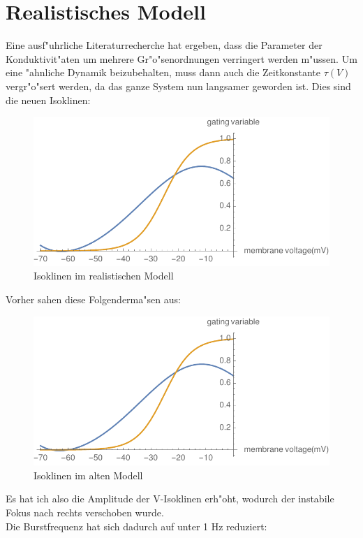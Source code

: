 \documentclass[12pt,a4paper]{article}
\begin{document}
\section{Realistisches Modell}
Eine ausf"uhrliche Literaturrecherche hat ergeben, dass die Parameter der Konduktivit"aten um mehrere Gr"o"senordnungen verringert werden m"ussen. Um eine "ahnliche Dynamik beizubehalten, muss dann auch die Zeitkonstante $\tau(V)$ vergr"o"sert werden, da das ganze System nun langsamer geworden ist.
Dies sind die neuen Isoklinen:
\begin{figure}[H]
	\centering
	\includegraphics[scale=0.9]{nullclines70Hz.pdf}
	\caption{Isoklinen im realistischen Modell}
	\label{isonew}
\end{figure}
Vorher sahen diese Folgenderma"sen aus:
\begin{figure}[H]
	\centering
	\includegraphics[scale=0.9]{nullclinenew.pdf}
	\caption{Isoklinen im alten Modell}
	\label{isoold}
\end{figure}
Es hat ich also die Amplitude der V-Isoklinen erh"oht, wodurch der instabile Fokus nach rechts verschoben wurde.\\
Die Burstfrequenz hat sich dadurch auf unter 1 Hz reduziert:
\end{document}
